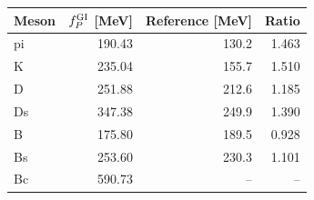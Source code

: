 \begin{tabular}{lrrr}
\toprule
Meson & $f_P^{\rm GI}$ [MeV] & Reference [MeV] & Ratio \\
\midrule
pi & 190.43 & 130.2 & 1.463 \\
K & 235.04 & 155.7 & 1.510 \\
D & 251.88 & 212.6 & 1.185 \\
Ds & 347.38 & 249.9 & 1.390 \\
B & 175.80 & 189.5 & 0.928 \\
Bs & 253.60 & 230.3 & 1.101 \\
Bc & 590.73 & -- & -- \\
\bottomrule
\end{tabular}
